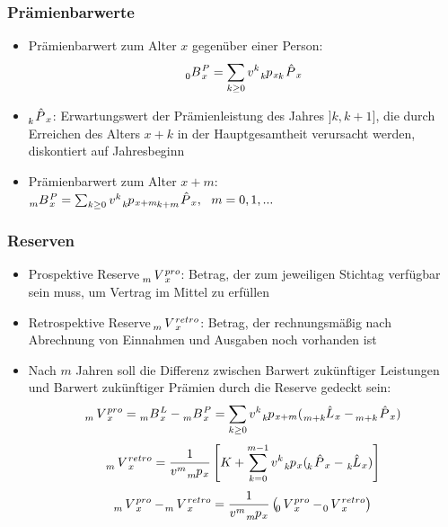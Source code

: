 \documentclass[12pt]{report}
\theoremstyle{dotless}
\theoremstyle{definition}
\begin{document}
\subsubsection{Prämienbarwerte}
\begin{itemize}
	\item Prämienbarwert zum Alter $x$ gegenüber einer Person:
	\begin{equation}
		\tensor[_{0}]{B}{}_x^{P} = \sum_{k \geq 0} v^k \tensor[_{k}]{p}{}_x \tensor[_{k}]{\hat{P}}{}_x
	\end{equation}
	\item $\tensor[_{k}]{\hat{P}}{}_x$: Erwartungswert der Prämienleistung des Jahres $]k,k+1]$, die durch Erreichen des Alters $x+k$ in der Hauptgesamtheit verursacht werden, diskontiert auf Jahresbeginn
	\item Prämienbarwert zum Alter $x+m$: $\tensor[_{m}]{B}{}_x^P = \sum_{k \geq 0}v^k \tensor[_{k}]{p}{}_{x+m} \tensor[_{k+m}]{\hat{P}}{}_x, \ \ m =0,1,...$
\end{itemize}

\subsubsection{Reserven}
\begin{itemize}
	\item Prospektive Reserve $\tensor[_{m}]{V}{}_x^{pro}$: Betrag, der zum jeweiligen Stichtag verfügbar sein muss, um Vertrag im Mittel zu erfüllen
	\item Retrospektive Reserve $\tensor[_{m}]{V}{}_x^{retro}$: Betrag, der rechnungsmäßig nach Abrechnung von Einnahmen und Ausgaben noch vorhanden ist
	\item Nach $m$ Jahren soll die Differenz zwischen Barwert zukünftiger Leistungen und Barwert zukünftiger Prämien durch die Reserve gedeckt sein: 
	\begin{equation}
		\tensor[_{m}]{V}{}_x^{pro} = \tensor[_{m}]{B}{}_x^{L} - \tensor[_{m}]{B}{}_x^{P} = \sum_{k \geq 0} v^k \tensor[_{k}]{p}{}_{x+m}(\tensor[_{m+k}]{\hat{L}}{}_x - \tensor[_{m+k}]{\hat{P}}{}_x)
	\end{equation}
	\begin{equation}
		\tensor[_{m}]{V}{}_x^{retro} = \frac{1}{v^m \tensor[_{m}]{p}{}_x} \left[K+\sum_{k=0}^{m-1}v^k \tensor[_{k}]{p}{}_x (\tensor[_{k}]{\hat{P}}{}_x - \tensor[_{k}]{\hat{L}}{}_x) \right]
	\end{equation}
	\begin{equation}
		\tensor[_{m}]{V}{}_x^{pro} - \tensor[_{m}]{V}{}_x^{retro} = \frac{1}{v^m \tensor[_{m}]{p}{}_x} \left(\tensor[_{0}]{V}{}_x^{pro} - \tensor[_{0}]{V}{}_x^{retro}\right)
	\end{equation}
\end{itemize}
\end{document}
